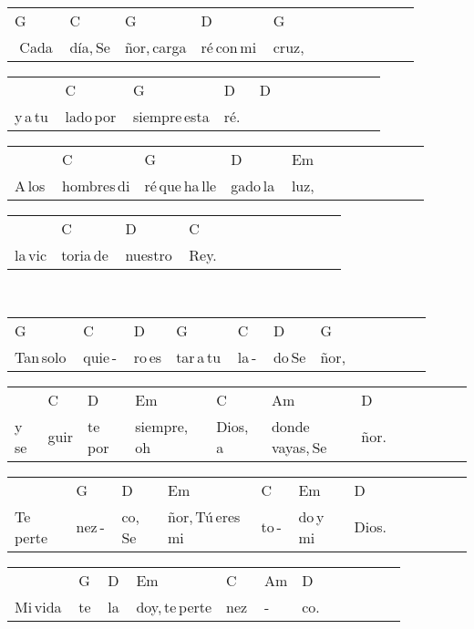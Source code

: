 \begin{multicols}{2}
\noindent
\begin{minipage}{\columnwidth}
\noindent
\noindent
\begin{tabular}{llllllllllll}
G&C&G&D&G\\
\,\,Cada\,&día,\,Se&ñor,\,carga&ré\,con\,mi\,&cruz,
\end{tabular}

\noindent
\begin{tabular}{llllllllllll}
&C&G&D&D\\
y\,a\,tu\,&lado\,por\,&siempre\,esta&ré.\,\,&
\end{tabular}

\noindent
\begin{tabular}{llllllllllll}
&C&G&D&Em\\
A\,los\,&hombres\,di&ré\,que\,ha\,lle&gado\,la\,&luz,
\end{tabular}

\noindent
\begin{tabular}{llllllllllll}
&C&D&C\\
la\,vic&toria\,de\,&nuestro\,&Rey.
\end{tabular}
\end{minipage}\\

\noindent
\begin{minipage}{\columnwidth}
\noindent
\noindent
\begin{tabular}{llllllllllll}
G&C&D&G&C&D&G\\
Tan\,solo\,&quie\,-\,&ro\,es&tar\,a\,tu\,&la\,-\,&do\,Se&ñor,
\end{tabular}

\noindent
\begin{tabular}{llllllllllll}
&C&D&Em&C&Am&D\\
y\,se&guir&te\,por\,&siempre,\,oh\,&Dios,\,a\,&donde\,vayas,\,Se&ñor.
\end{tabular}

\noindent
\begin{tabular}{llllllllllll}
&G&D&Em&C&Em&D\\
Te\,perte&nez\,-\,&co,\,Se&ñor,\,Tú\,eres\,mi\,&to\,-\,&do\,y\,mi\,&Dios.
\end{tabular}

\noindent
\begin{tabular}{llllllllllll}
&G&D&Em&C&Am&D\\
Mi\,vida\,&te\,&la\,&doy,\,te\,perte&nez\,&-\,&co.
\end{tabular}
\end{minipage}\\


\end{multicols}
